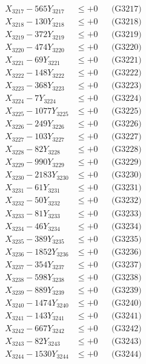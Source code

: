 \documentclass[a4paper,10pt]{article}
\begin{document}
{\begin{align}
X_{3217} - 565Y_{3217} &\leq +0 && \text{(G3217)} \\
X_{3218} - 130Y_{3218} &\leq +0 && \text{(G3218)} \\
X_{3219} - 372Y_{3219} &\leq +0 && \text{(G3219)} \\
X_{3220} - 474Y_{3220} &\leq +0 && \text{(G3220)} \\
\allowbreak
X_{3221} - 69Y_{3221} &\leq +0 && \text{(G3221)} \\
X_{3222} - 148Y_{3222} &\leq +0 && \text{(G3222)} \\
X_{3223} - 368Y_{3223} &\leq +0 && \text{(G3223)} \\
X_{3224} - 7Y_{3224} &\leq +0 && \text{(G3224)} \\
X_{3225} - 1077Y_{3225} &\leq +0 && \text{(G3225)} \\
X_{3226} - 249Y_{3226} &\leq +0 && \text{(G3226)} \\
X_{3227} - 103Y_{3227} &\leq +0 && \text{(G3227)} \\
X_{3228} - 82Y_{3228} &\leq +0 && \text{(G3228)} \\
X_{3229} - 990Y_{3229} &\leq +0 && \text{(G3229)} \\
X_{3230} - 2183Y_{3230} &\leq +0 && \text{(G3230)} \\
\allowbreak
X_{3231} - 61Y_{3231} &\leq +0 && \text{(G3231)} \\
X_{3232} - 50Y_{3232} &\leq +0 && \text{(G3232)} \\
X_{3233} - 81Y_{3233} &\leq +0 && \text{(G3233)} \\
X_{3234} - 46Y_{3234} &\leq +0 && \text{(G3234)} \\
X_{3235} - 389Y_{3235} &\leq +0 && \text{(G3235)} \\
X_{3236} - 1852Y_{3236} &\leq +0 && \text{(G3236)} \\
X_{3237} - 354Y_{3237} &\leq +0 && \text{(G3237)} \\
X_{3238} - 598Y_{3238} &\leq +0 && \text{(G3238)} \\
X_{3239} - 889Y_{3239} &\leq +0 && \text{(G3239)} \\
X_{3240} - 1474Y_{3240} &\leq +0 && \text{(G3240)} \\
\allowbreak
X_{3241} - 143Y_{3241} &\leq +0 && \text{(G3241)} \\
X_{3242} - 667Y_{3242} &\leq +0 && \text{(G3242)} \\
X_{3243} - 82Y_{3243} &\leq +0 && \text{(G3243)} \\
X_{3244} - 1530Y_{3244} &\leq +0 && \text{(G3244)} \\

\end{align}}
\end{document}
